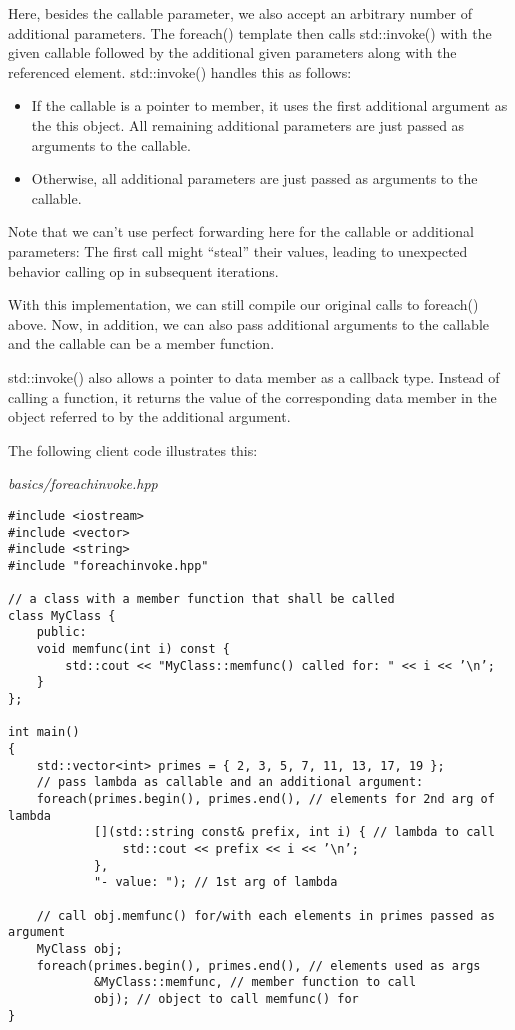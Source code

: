 Here, besides the callable parameter, we also accept an arbitrary number of additional parameters. The foreach() template then calls std::invoke() with the given callable followed by the additional given parameters along with the referenced element. std::invoke() handles this as follows:

\begin{itemize}
\item 
If the callable is a pointer to member, it uses the first additional argument as the this object. All remaining additional parameters are just passed as arguments to the callable.

\item 
Otherwise, all additional parameters are just passed as arguments to the callable.
\end{itemize}

Note that we can’t use perfect forwarding here for the callable or additional parameters: The first call might “steal” their values, leading to unexpected behavior calling op in subsequent iterations.

With this implementation, we can still compile our original calls to foreach() above. Now, in addition, we can also pass additional arguments to the callable and the callable can be a member function.

\begin{tcolorbox}[colback=webgreen!5!white,colframe=webgreen!75!black]
\hspace*{0.75cm}std::invoke() also allows a pointer to data member as a callback type. Instead of calling a function, it returns the value of the corresponding data member in the object referred to by the additional argument.
\end{tcolorbox}

The following client code illustrates this:

\noindent
\textit{basics/foreachinvoke.hpp}
\begin{lstlisting}[style=styleCXX]
#include <iostream>
#include <vector>
#include <string>
#include "foreachinvoke.hpp"

// a class with a member function that shall be called
class MyClass {
	public:
	void memfunc(int i) const {
		std::cout << "MyClass::memfunc() called for: " << i << ’\n’;
	}
};

int main()
{
	std::vector<int> primes = { 2, 3, 5, 7, 11, 13, 17, 19 };
	// pass lambda as callable and an additional argument:
	foreach(primes.begin(), primes.end(), // elements for 2nd arg of lambda
			[](std::string const& prefix, int i) { // lambda to call
				std::cout << prefix << i << ’\n’;
			},
			"- value: "); // 1st arg of lambda
			
	// call obj.memfunc() for/with each elements in primes passed as argument
	MyClass obj;
	foreach(primes.begin(), primes.end(), // elements used as args
			&MyClass::memfunc, // member function to call
			obj); // object to call memfunc() for
}
\end{lstlisting}


